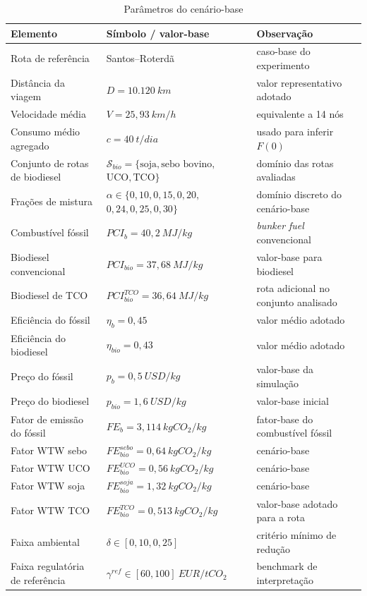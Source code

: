 \begin{table}[!ht]
\centering
\caption{Parâmetros do cenário-base}
\label{tab:parametrizacao_e1}
\small
\begin{tabular}{@{}L{3.4cm} L{4.4cm} L{5.4cm}@{}}
\hline
\textbf{Elemento} & \textbf{Símbolo / valor-base} & \textbf{Observação} \\
\hline
Rota de referência & Santos--Roterdã & caso-base do experimento \\
Distância da viagem & $D = 10.120~km$ & valor representativo adotado \\
Velocidade média & $V = 25{,}93~km/h$ & equivalente a 14 nós \\
Consumo médio agregado & $c = 40~t/dia$ & usado para inferir $F(0)$ \\
Conjunto de rotas de biodiesel &  & domínio das rotas avaliadas \\
Frações de mistura &  & domínio discreto do cenário-base \\
Combustível fóssil & $PCI_b = 40{,}2~MJ/kg$ & \emph{bunker fuel} convencional \\
Biodiesel convencional & $PCI_{bio} = 37{,}68~MJ/kg$ & valor-base para biodiesel \\
Biodiesel de \gls{TCO} & $PCI_{bio}^{TCO} = 36{,}64~MJ/kg$ & rota adicional no conjunto analisado \\
Eficiência do fóssil & $\eta_b = 0{,}45$ & valor médio adotado \\
Eficiência do biodiesel & $\eta_{bio} = 0{,}43$ & valor médio adotado \\
Preço do fóssil & $p_b = 0{,}5~USD/kg$ & valor-base da simulação \\
Preço do biodiesel & $p_{bio} = 1{,}6~USD/kg$ & valor-base inicial \\
Fator de emissão do fóssil & $FE_b = 3{,}114~kgCO_2/kg$ & fator-base do combustível fóssil \\
Fator \gls{WTW} sebo & $FE_{bio}^{sebo} = 0{,}64~kgCO_2/kg$ & cenário-base \\
Fator \gls{WTW} \gls{UCO} & $FE_{bio}^{UCO} = 0{,}56~kgCO_2/kg$ & cenário-base \\
Fator \gls{WTW} soja & $FE_{bio}^{soja} = 1{,}32~kgCO_2/kg$ & cenário-base \\
Fator \gls{WTW} \gls{TCO} & $FE_{bio}^{TCO} = 0{,}513~kgCO_2/kg$ & valor-base adotado para a rota \\
Faixa ambiental & $\delta \in [0{,}10,0{,}25]$ & critério mínimo de redução \\
Faixa regulatória de referência & $\gamma^{ref} \in [60,100]~EUR/tCO_2$ & benchmark de interpretação \\
\hline
\end{tabular}
\end{table}

